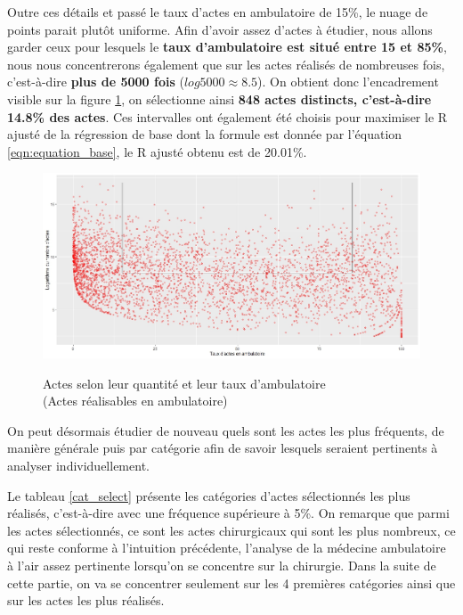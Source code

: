 Outre ces détails et passé le taux d'actes en ambulatoire de 15\%, le nuage de points parait plutôt uniforme. Afin d'avoir assez d'actes à étudier, nous allons garder ceux pour lesquels le \textbf{taux d'ambulatoire est situé entre 15 et 85\%}, nous nous concentrerons également que sur les actes réalisés de nombreuses fois, c'est-à-dire \textbf{plus de 5000 fois} ($log 
5000 \approx 8.5$). On obtient donc l'encadrement visible sur la figure \ref{nuage_part_nb}, on sélectionne ainsi \textbf{848 actes distincts, c'est-à-dire 14.8\% des actes}. Ces intervalles ont également été choisis pour maximiser le R ajusté de la régression de base dont la formule est donnée par l'équation \ref{eqn:equation_base}, le R ajusté obtenu est de 20.01\%.\\


 


\begin{figure}[!ht]
    \centering
    \caption{Actes selon leur quantité et leur taux d'ambulatoire\\(Actes réalisables en ambulatoire)}
    \includegraphics[scale=0.55]{Images/nuage_part_nb.jpeg}
    \label{nuage_part_nb}
\end{figure}


On peut désormais étudier de nouveau quels sont les actes les plus fréquents, de manière générale puis par catégorie afin de savoir lesquels seraient pertinents à analyser individuellement. 

Le tableau \ref{cat_select} présente les catégories d'actes sélectionnés les plus réalisés, c'est-à-dire avec une fréquence supérieure à 5\%. On remarque que parmi les actes sélectionnés, ce sont les actes chirurgicaux qui sont les plus nombreux, ce qui reste conforme à l'intuition précédente, l'analyse de la médecine ambulatoire à l'air assez pertinente lorsqu'on se concentre sur la chirurgie. Dans la suite de cette partie, on va se concentrer seulement sur les 4 premières catégories ainsi que sur les actes les plus réalisés.\\

